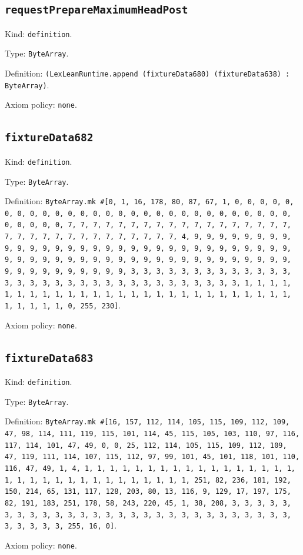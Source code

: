 \documentclass[11pt]{article}
\begin{document}
\subsection*{\texttt{requestPrepareMaximumHeadPost}}
\noindent Kind: \texttt{definition}.\par
\noindent Type: \texttt{ByteArray}.\par
\noindent Definition: \texttt{(LexLeanRuntime.append (fixtureData680) (fixtureData638) : ByteArray)}.\par
\noindent Axiom policy: \texttt{none}.\par
\subsection*{\texttt{fixtureData682}}
\noindent Kind: \texttt{definition}.\par
\noindent Type: \texttt{ByteArray}.\par
\noindent Definition: \texttt{ByteArray.mk \#[0, 1, 16, 178, 80, 87, 67, 1, 0, 0, 0, 0, 0, 0, 0, 0, 0, 0, 0, 0, 0, 0, 0, 0, 0, 0, 0, 0, 0, 0, 0, 0, 0, 0, 0, 0, 0, 0, 0, 0, 0, 7, 7, 7, 7, 7, 7, 7, 7, 7, 7, 7, 7, 7, 7, 7, 7, 7, 7, 7, 7, 7, 7, 7, 7, 7, 7, 7, 7, 7, 7, 7, 7, 4, 9, 9, 9, 9, 9, 9, 9, 9, 9, 9, 9, 9, 9, 9, 9, 9, 9, 9, 9, 9, 9, 9, 9, 9, 9, 9, 9, 9, 9, 9, 9, 9, 9, 9, 9, 9, 9, 9, 9, 9, 9, 9, 9, 9, 9, 9, 9, 9, 9, 9, 9, 9, 9, 9, 9, 9, 9, 9, 9, 9, 9, 9, 9, 9, 3, 3, 3, 3, 3, 3, 3, 3, 3, 3, 3, 3, 3, 3, 3, 3, 3, 3, 3, 3, 3, 3, 3, 3, 3, 3, 3, 3, 3, 3, 3, 3, 1, 1, 1, 1, 1, 1, 1, 1, 1, 1, 1, 1, 1, 1, 1, 1, 1, 1, 1, 1, 1, 1, 1, 1, 1, 1, 1, 1, 1, 1, 1, 1, 0, 255, 230]}.\par
\noindent Axiom policy: \texttt{none}.\par
\subsection*{\texttt{fixtureData683}}
\noindent Kind: \texttt{definition}.\par
\noindent Type: \texttt{ByteArray}.\par
\noindent Definition: \texttt{ByteArray.mk \#[16, 157, 112, 114, 105, 115, 109, 112, 109, 47, 98, 114, 111, 119, 115, 101, 114, 45, 115, 105, 103, 110, 97, 116, 117, 114, 101, 47, 49, 0, 0, 25, 112, 114, 105, 115, 109, 112, 109, 47, 119, 111, 114, 107, 115, 112, 97, 99, 101, 45, 101, 118, 101, 110, 116, 47, 49, 1, 4, 1, 1, 1, 1, 1, 1, 1, 1, 1, 1, 1, 1, 1, 1, 1, 1, 1, 1, 1, 1, 1, 1, 1, 1, 1, 1, 1, 1, 1, 1, 1, 1, 251, 82, 236, 181, 192, 150, 214, 65, 131, 117, 128, 203, 80, 13, 116, 9, 129, 17, 197, 175, 82, 191, 183, 251, 178, 58, 243, 220, 45, 1, 38, 208, 3, 3, 3, 3, 3, 3, 3, 3, 3, 3, 3, 3, 3, 3, 3, 3, 3, 3, 3, 3, 3, 3, 3, 3, 3, 3, 3, 3, 3, 3, 3, 3, 3, 255, 16, 0]}.\par
\noindent Axiom policy: \texttt{none}.\par
\end{document}

